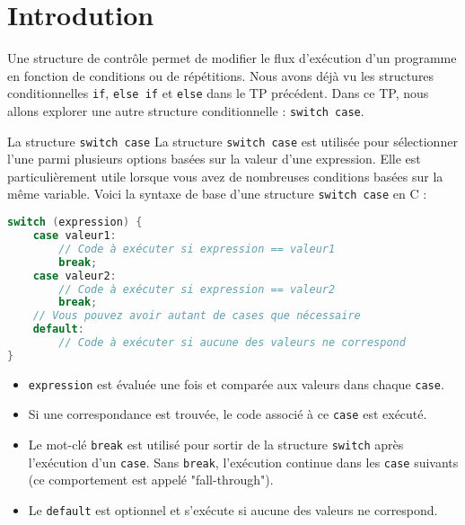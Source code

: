 
\section{Introdution}
Une structure de contrôle permet de modifier le flux d'exécution d'un programme en fonction de conditions ou de répétitions.
Nous avons déjà vu les structures conditionnelles \texttt{if}, \texttt{else if} et \texttt{else} dans le TP précédent.
Dans ce TP, nous allons explorer une autre structure conditionnelle : \texttt{switch case}.


\begin{UPSTIinfor}{La structure \texttt{switch case}}
	La structure \texttt{switch case} est utilisée pour sélectionner l'une parmi plusieurs options basées sur la valeur d'une expression.
	Elle est particulièrement utile lorsque vous avez de nombreuses conditions basées sur la même variable.
	Voici la syntaxe de base d'une structure \texttt{switch case} en C :
	\begin{lstlisting}[language=c]
switch (expression) {
    case valeur1:
        // Code à exécuter si expression == valeur1
        break;
    case valeur2:
        // Code à exécuter si expression == valeur2
        break;
    // Vous pouvez avoir autant de cases que nécessaire
    default:
        // Code à exécuter si aucune des valeurs ne correspond
}
\end{lstlisting}
	\begin{itemize}
		\item \texttt{expression} est évaluée une fois et comparée aux valeurs dans chaque \texttt{case}.
		\item Si une correspondance est trouvée, le code associé à ce \texttt{case} est exécuté.
		\item Le mot-clé \texttt{break} est utilisé pour sortir de la structure \texttt{switch} après l'exécution d'un \texttt{case}. Sans \texttt{break}, l'exécution continue dans les \texttt{case} suivants (ce comportement est appelé "fall-through").
		\item Le \texttt{default} est optionnel et s'exécute si aucune des valeurs ne correspond.
	\end{itemize}
\end{UPSTIinfor}

